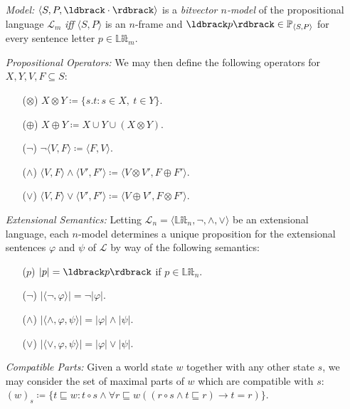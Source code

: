 \documentclass[a4paper, 11pt]{article} %
\newcommand{\tuple}[1]{\langle#1\rangle} %
\newcommand{\set}[1]{\lbrace#1\rbrace} %
\renewcommand{\P}[0]{\mathbb{P}}
\newcommand{\Lit}[0]{\mathbb{Lit}}
\renewcommand{\L}[0]{\mathcal{L}}
\renewcommand{\Vert}[1]{\ldbrack#1\rdbrack}
\renewcommand{\vert}[1]{\lvert#1\rvert}
\begin{document}
\begin{enumerate}
  \item[\it Model:] $\tuple{S,P,\Vert{\cdot}}$ is a \textit{bitvector $n$-model} of the propositional language $\L_m$ \textit{iff} $\tuple{S,P}$ is an $n$-frame and $\Vert{p}\in\P_{\tuple{S,P}}$ for every sentence letter $p\in\Lit_m$.
  \item[\it Propositional Operators:] We may then define the following operators for $X,Y,V,F\subseteq S$:
    \begin{itemize}
      \item[($\otimes$)] $X \otimes Y \coloneq \set{s.t : s \in X,\ t \in Y}$.
      \item[($\oplus$)] $X \oplus Y \coloneq X \cup Y \cup (X \otimes Y)$.
      \item[($\neg$)] $\neg\tuple{V,F} \coloneq \tuple{F,V}$.
      \item[($\wedge$)] $\tuple{V,F}\wedge\tuple{V',F'} \coloneq \tuple{V\otimes V',F\oplus F'}$.
      \item[($\vee$)] $\tuple{V,F}\vee\tuple{V',F'} \coloneq \tuple{V\oplus V',F\otimes F'}$.
    \end{itemize}
  \item[\it Extensional Semantics:] Letting $\L_n=\tuple{\Lit_n,\neg,\wedge,\vee}$ be an extensional language, each $n$-model determines a unique proposition for the extensional sentences $\varphi$ and $\psi$ of $\L$ by way of the following semantics: 
    \begin{itemize}
      \item[($p$)] $\vert{p}=\Vert{p}$ if $p\in\Lit_n$.
      \item[($\neg$)] $\vert{\tuple{\neg,\varphi}}=\neg\vert{\varphi}$.
      \item[($\wedge$)] $\vert{\tuple{\wedge,\varphi,\psi}}=\vert{\varphi}\wedge\vert{\psi}$.
      \item[($\vee$)] $\vert{\tuple{\vee,\varphi,\psi}}=\vert{\varphi}\vee\vert{\psi}$.
    \end{itemize}
  \item[\it Compatible Parts:] Given a world state $w$ together with any other state $s$, we may consider the set of maximal parts of $w$ which are compatible with $s$:\\ 
    $(w)_s\coloneq \set{t\sqsubseteq w:t\circ s \wedge \forall r\sqsubseteq w((r\circ s \wedge t \sqsubseteq r) \rightarrow t = r)}$.

\end{enumerate}
\end{document}
